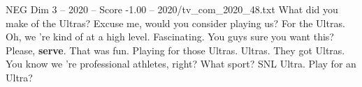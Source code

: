 \begin{textsample}{NEG Dim 3 – 2020 – Score -1.00 – 2020/tv\_com\_2020\_48.txt}  \label{ex:f3_neg_032}
What did you make of the Ultras?
Excuse me, would you consider playing us?
For the Ultras.
Oh, we 're kind of at a high level.
Fascinating.
You guys sure you want this?
Please, \textbf{serve}.
That was fun.
Playing for those Ultras.
Ultras.
They got Ultras.
You know we 're professional athletes, right?
What sport?
SNL Ultra.
Play for an Ultra?

\end{textsample}
